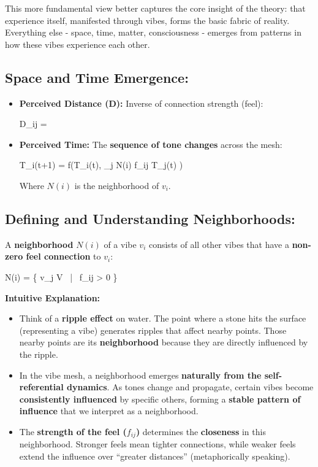 \documentclass{article}
\let\oldequation\equation
\let\endoldequation\endequation
\renewenvironment{equation}{%
    \noindent\vspace{-\parskip}\vspace{-\baselineskip}%
    \oldequation
}{%
    \endoldequation
    \noindent\vspace{-\parskip}\vspace{-\baselineskip}%
}
\theoremstyle{definition}
\theoremstyle{axiom}
\theoremstyle{theorem}
\theoremstyle{lemma}
\theoremstyle{proposition}
\begin{document}
This more fundamental view better captures the core insight of the theory: that experience itself, manifested through vibes, forms the basic fabric of reality. Everything else - space, time, matter, consciousness - emerges from patterns in how these vibes experience each other.
\subsection{Space and Time Emergence:}

\begin{itemize}
\item \textbf{Perceived Distance (D):} Inverse of connection strength (feel):

\begin{equation}
D_{ij} = 
\end{equation}

\item \textbf{Perceived Time:} The \textbf{sequence of tone changes} across the mesh:

\begin{equation}
T_i(t+1) = f\left(T_i(t), \sum_{j \in N(i)} f_{ij} \cdot T_j(t) \right)
\end{equation}

Where $N(i)$ is the neighborhood of $v_i$.
\end{itemize}

\subsection{Defining and Understanding Neighborhoods:}

A \textbf{neighborhood} $N(i)$ of a vibe $v_i$ consists of all other vibes that have a \textbf{non-zero feel connection} to $v_i$:

\begin{equation}
N(i) = \{ v_j \in V \ | \ f_{ij} > 0 \}
\end{equation}

\textbf{Intuitive Explanation:}

\begin{itemize}
\item Think of a \textbf{ripple effect} on water. The point where a stone hits the surface (representing a vibe) generates ripples that affect nearby points. Those nearby points are its \textbf{neighborhood} because they are directly influenced by the ripple.
\item In the vibe mesh, a neighborhood emerges \textbf{naturally from the self-referential dynamics}. As tones change and propagate, certain vibes become \textbf{consistently influenced} by specific others, forming a \textbf{stable pattern of influence} that we interpret as a neighborhood.
\item The \textbf{strength of the feel ($f_{ij}$)} determines the \textbf{closeness} in this neighborhood. Stronger feels mean tighter connections, while weaker feels extend the influence over \enquote{greater distances} (metaphorically speaking).
\end{itemize}
\end{document}
